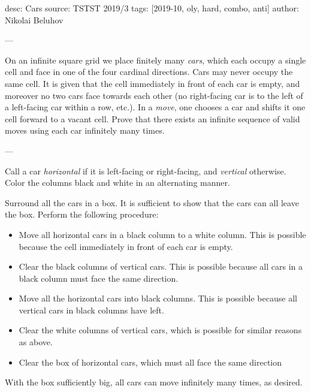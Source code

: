 desc: Cars
source: TSTST 2019/3
tags: [2019-10, oly, hard, combo, anti]
author: Nikolai Beluhov

---

On an infinite square grid we place finitely many \emph{cars}, which each occupy a single cell and face in one of the four cardinal directions. Cars may never occupy the same cell. It is given that the cell immediately in front of  each car is empty, and moreover no two cars face towards each other (no right-facing car is to the left of a left-facing car within a row, etc.). In a \emph{move}, one chooses a car and shifts it one cell forward to a vacant cell. Prove that there exists an infinite sequence of valid moves using each car infinitely many times.

---

Call a car \emph{horizontal} if it is left-facing or right-facing, and \emph{vertical} otherwise. Color the columns black and white in an alternating manner.

Surround all the cars in a box. It is sufficient to show that the cars can all leave the box. Perform the following procedure:
\begin{itemize}
    \item Move all horizontal cars in a black column to a white column. This is possible because the cell immediately in front of each car is empty.
    \item Clear the black columns of vertical cars. This is possible because all cars in a black column must face the same direction.
    \item Move all the horizontal cars into black columns. This is possible because all vertical cars in black columns have left.
    \item Clear the white columns of vertical cars, which is possible for similar reasons as above.
    \item Clear the box of horizontal cars, which must all face the same direction
\end{itemize}
With the box sufficiently big, all cars can move infinitely many times, as desired.
